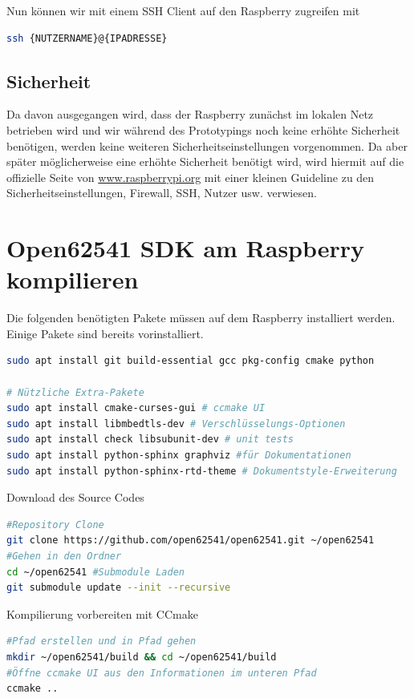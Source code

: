 Nun können wir mit einem SSH Client auf den Raspberry zugreifen mit
\begin{lstlisting}[language=Bash]
 ssh {NUTZERNAME}@{IPADRESSE}
\end{lstlisting}
\subsection{Sicherheit}
Da davon ausgegangen wird, dass der Raspberry zunächst im lokalen Netz betrieben wird und wir während des Prototypings noch keine erhöhte Sicherheit benötigen, werden keine weiteren Sicherheitseinstellungen vorgenommen. Da aber später möglicherweise eine erhöhte Sicherheit benötigt wird, wird hiermit auf die offizielle Seite von \hyperref[https://www.raspberrypi.org/documentation/configuration/security.md 
]{www.raspberrypi.org} mit einer kleinen Guideline zu den Sicherheitseinstellungen, Firewall, SSH, Nutzer usw. verwiesen.

\section{Open62541 SDK am Raspberry kompilieren}
Die folgenden benötigten Pakete müssen auf dem Raspberry installiert werden. Einige Pakete sind bereits vorinstalliert.

\begin{lstlisting}[language=Bash]
sudo apt install git build-essential gcc pkg-config cmake python

# Nützliche Extra-Pakete
sudo apt install cmake-curses-gui # ccmake UI
sudo apt install libmbedtls-dev # Verschlüsselungs-Optionen
sudo apt install check libsubunit-dev # unit tests
sudo apt install python-sphinx graphviz #für Dokumentationen
sudo apt install python-sphinx-rtd-theme # Dokumentstyle-Erweiterung
\end{lstlisting}

Download des Source Codes
\begin{lstlisting}[language=Bash]
#Repository Clone
git clone https://github.com/open62541/open62541.git ~/open62541
#Gehen in den Ordner
cd ~/open62541 #Submodule Laden
git submodule update --init --recursive
\end{lstlisting}

Kompilierung vorbereiten mit CCmake
\begin{lstlisting}[language=Bash]
#Pfad erstellen und in Pfad gehen
mkdir ~/open62541/build && cd ~/open62541/build
#Öffne ccmake UI aus den Informationen im unteren Pfad
ccmake ..
\end{lstlisting}

